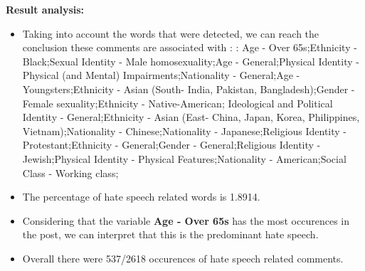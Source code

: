 \documentclass[11pt]{article}
\begin{document}
\textbf{\Large Result analysis:}

\begin{itemize}\item Taking into account the words that were detected, we can reach the conclusion these comments are associated with : : Age - Over 65s;Ethnicity - Black;Sexual Identity - Male homosexuality;Age - General;Physical Identity - Physical (and Mental) Impairments;Nationality - General;Age - Youngsters;Ethnicity - Asian (South- India, Pakistan, Bangladesh);Gender - Female sexuality;Ethnicity - Native-American; Ideological and Political Identity - General;Ethnicity - Asian (East- China, Japan, Korea, Philippines, Vietnam);Nationality - Chinese;Nationality - Japanese;Religious Identity - Protestant;Ethnicity - General;Gender - General;Religious Identity - Jewish;Physical Identity - Physical Features;Nationality - American;Social Class - Working class;%

\item The percentage of hate speech related words is 1.8914.

\item Considering that the variable \textbf{Age - Over 65s} has the most occurences in the post, we can interpret that this is the predominant hate speech.

\item Overall there were 537/2618 occurences of hate speech related comments.\end{itemize}
\end{document}
